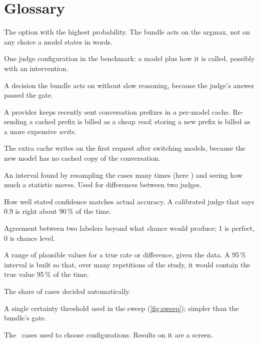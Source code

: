 \section{Glossary}\label{app:glossary}

\begin{description}[leftmargin=1.2em,style=nextline,itemsep=3pt]
  \item[Argmax] The option with the highest probability. The bundle acts on the argmax, not on any
    choice a model states in words.
  \item[Arm] One judge configuration in the benchmark: a model plus how it is called, possibly with an
    intervention.
  \item[Automatic decision] A decision the bundle acts on without slow reasoning, because the judge's
    answer passed the gate.
  \item[Cache read, cache write] A provider keeps recently sent conversation prefixes in a per-model
    cache. Re-sending a cached prefix is billed as a cheap \emph{read}; storing a new prefix is billed as a
    more expensive \emph{write}.
  \item[Cache rebuild] The extra cache writes on the first request after switching models, because the new
    model has no cached copy of the conversation.
  \item[Bootstrap confidence interval] An interval found by resampling the cases many times (here
    \BootstrapB) and seeing how much a statistic moves. Used for differences between two judges.
  \item[Calibration] How well stated confidence matches actual accuracy. A calibrated judge that says
    0.9 is right about 90\,\% of the time.
  \item[Cohen's kappa ($\kappa$)] Agreement between two labelers beyond what chance would produce;
    1 is perfect, 0 is chance level.
  \item[Confidence interval (CI)] A range of plausible values for a true rate or difference, given the
    data. A 95\,\% interval is built so that, over many repetitions of the study, it would contain the
    true value 95\,\% of the time.
  \item[Coverage] The share of cases decided automatically.
  \item[Cutoff] A single certainty threshold used in the sweep (\cref{fig:sweep}); simpler than the
    bundle's gate.
  \item[Dev split] The \DevN\ cases used to choose configurations. Results on it are a screen.

\end{description}
